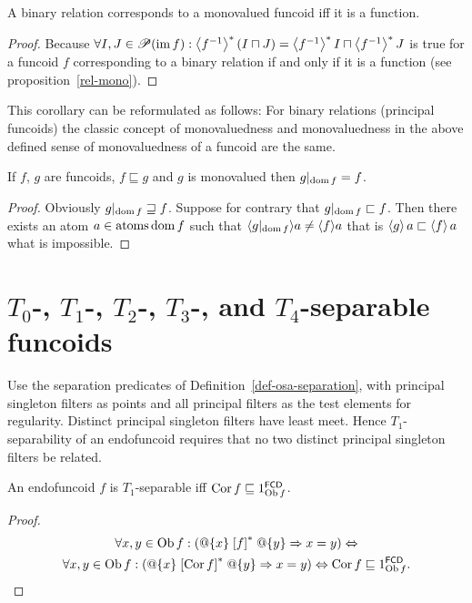 \begin{cor}
A binary relation corresponds to a monovalued funcoid iff it is a
function.\end{cor}
\begin{proof}
Because $\forall I,J\in\mathscr{P}(\operatorname{im} f):\left\langle f^{-1}\right\rangle ^{\ast}(I\sqcap
J)=\left\langle f^{-1}\right\rangle ^{\ast}I\sqcap\left\langle f^{-1}\right\rangle ^{\ast}J$
is true for a funcoid $f$ corresponding to a binary relation if and
only if it is a function (see proposition~\ref{rel-mono}).\end{proof}
\begin{rem}
This corollary can be reformulated as follows: For binary relations
(principal funcoids) the classic concept of monovaluedness and monovaluedness
in the above defined sense of monovaluedness of a funcoid are the
same.\end{rem}
\begin{thm}
If $f$, $g$ are funcoids, $f\sqsubseteq g$ and $g$ is monovalued
then $g|_{\operatorname{dom} f}=f$.\end{thm}
\begin{proof}
Obviously $g|_{\operatorname{dom} f}\sqsupseteq f$. Suppose for contrary that $g|_{\operatorname{dom}
f}\sqsubset f$.
Then there exists an atom $a\in\operatorname{atoms}\operatorname{dom} f$ such that $\langle g|_{\operatorname{dom}
f}\rangle a\neq\langle f\rangle a$
that is $\left\langle g\right\rangle a\sqsubset\left\langle f\right\rangle a$ what is impossible.
\end{proof}

\section{\texorpdfstring{$T_{0}$-, $T_{1}$-, $T_{2}$-, $T_{3}$-, and $T_{4}$-separable
funcoids}%
{T0-, T1-, T2-, T3-, and T4-separable funcoids}}

Use the separation predicates of Definition~\ref{def-osa-separation},
with principal singleton filters as points and all principal filters
as the test elements for regularity. Distinct principal singleton
filters have least meet. Hence $T_1$-separability of an endofuncoid
requires that no two distinct principal singleton filters be related.

\begin{prop}
An endofuncoid $f$ is $T_{1}$-separable iff $\operatorname{Cor} f\sqsubseteq1_{\operatorname{Ob}
f}^{\mathsf{FCD}}$.\end{prop}
\begin{proof}
~
\begin{multline*}
\forall x,y\in\operatorname{Ob} f:(@\{x\}\mathrel{\left[f\right]^{\ast}}@\{y\}\Rightarrow x=y)\Leftrightarrow\\
\forall x,y\in\operatorname{Ob} f:(@\{x\}\mathrel{\left[\operatorname{Cor} f\right]^{\ast}}@\{y\}\Rightarrow x=y)\Leftrightarrow\operatorname{Cor} f\sqsubseteq1_{\operatorname{Ob} f}^{\mathsf{FCD}}.
\end{multline*}
\end{proof}

